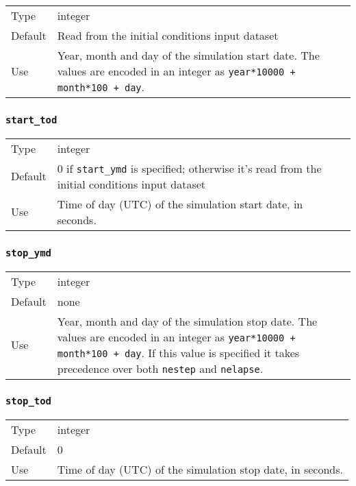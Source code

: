 \documentclass[12pt]{article}
\newcommand{\code}[1]{\texttt{#1}}
\begin{document}
\begin{tabular}{lp{5.5in}}
Type    & integer \\
Default & Read from the initial conditions input dataset \\
Use     &  
Year, month and day of the simulation start date.  The values are encoded
in an integer as \code{year*10000 + month*100 + day}.
\end{tabular}

\subsubsection{\code{start\_tod}}

\begin{tabular}{lp{5.5in}}
Type    & integer \\
Default & 0 if \code{start\_ymd} is specified; otherwise it's read from the
initial conditions input dataset \\
Use     &  
Time of day (UTC) of the simulation start date, in seconds.
\end{tabular}

\subsubsection{\code{stop\_ymd}}

\begin{tabular}{lp{5.5in}}
Type    & integer \\
Default & none \\
Use     &  
Year, month and day of the simulation stop date.  The values are encoded
in an integer as \code{year*10000 + month*100 + day}.  If this value is
specified it takes precedence over both \code{nestep} and \code{nelapse}.
\end{tabular}

\subsubsection{\code{stop\_tod}}

\begin{tabular}{lp{5.5in}}
Type    & integer \\
Default & 0 \\
Use     &  
Time of day (UTC) of the simulation stop date, in seconds.
\end{tabular}
\end{document}
